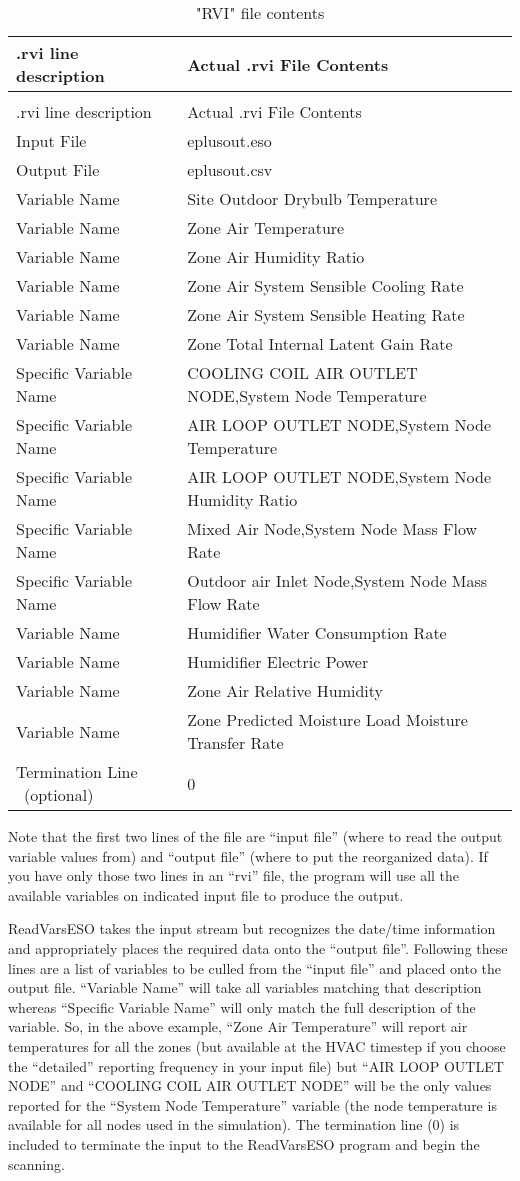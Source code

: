\begin{longtable}[c]{p{2.1in}p{3.9in}}
\caption{"RVI" file contents \label{table:rvi-file-contents}} \tabularnewline
\toprule 
.rvi line description & Actual .rvi File Contents \tabularnewline
\midrule
\endfirsthead

\caption[]{"RVI" file contents} \tabularnewline
\toprule 
.rvi line description & Actual .rvi File Contents \tabularnewline
\midrule
\endhead

Input File & eplusout.eso \tabularnewline
Output File & eplusout.csv \tabularnewline
Variable Name & Site Outdoor Drybulb Temperature \tabularnewline
Variable Name & Zone Air Temperature \tabularnewline
Variable Name & Zone Air Humidity Ratio \tabularnewline
Variable Name & Zone Air System Sensible Cooling Rate \tabularnewline
Variable Name & Zone Air System Sensible Heating Rate \tabularnewline
Variable Name & Zone Total Internal Latent Gain Rate \tabularnewline
Specific Variable Name & COOLING COIL AIR OUTLET NODE,System Node Temperature \tabularnewline
Specific Variable Name & AIR LOOP OUTLET NODE,System Node Temperature \tabularnewline
Specific Variable Name & AIR LOOP OUTLET NODE,System Node Humidity Ratio \tabularnewline
Specific Variable Name & Mixed Air Node,System Node Mass Flow Rate \tabularnewline
Specific Variable Name & Outdoor air Inlet Node,System Node Mass Flow Rate \tabularnewline
Variable Name & Humidifier Water Consumption Rate \tabularnewline
Variable Name & Humidifier Electric Power \tabularnewline
Variable Name & Zone Air Relative Humidity \tabularnewline
Variable Name & Zone Predicted Moisture Load Moisture Transfer Rate \tabularnewline
Termination Line ~(optional) & 0 \tabularnewline
\bottomrule
\end{longtable}

Note that the first two lines of the file are ``input file'' (where to read the output variable values from) and ``output file'' (where to put the reorganized data). If you have only those two lines in an ``rvi'' file, the program will use all the available variables on indicated input file to produce the output.

ReadVarsESO takes the input stream but recognizes the date/time information and appropriately places the required data onto the ``output file''. Following these lines are a list of variables to be culled from the ``input file'' and placed onto the output file. ``Variable Name'' will take all variables matching that description whereas ``Specific Variable Name'' will only match the full description of the variable. So, in the above example, ``Zone Air Temperature'' will report air temperatures for all the zones (but available at the HVAC timestep if you choose the ``detailed'' reporting frequency in your input file) but ``AIR LOOP OUTLET NODE'' and ``COOLING COIL AIR OUTLET NODE'' will be the only values reported for the ``System Node Temperature'' variable (the node temperature is available for all nodes used in the simulation). The termination line (0) is included to terminate the input to the ReadVarsESO program and begin the scanning.

